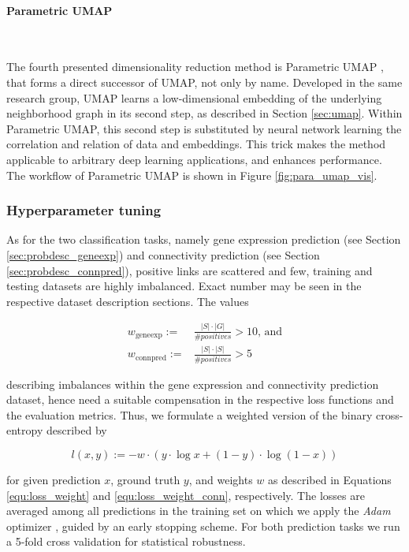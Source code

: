 \documentclass[]{article}
\renewcommand{\cite}{\citep}
\begin{document}
\paragraph{Parametric UMAP}\mbox{}\\
\label{sec:paraumap}

The fourth presented dimensionality reduction method is Parametric UMAP \cite{sainburg2021parametric}, that forms a direct successor of UMAP, not only by name. Developed in the same research group, UMAP learns a low-dimensional embedding of the underlying neighborhood graph in its second step, as described in Section \ref{sec:umap}. Within Parametric UMAP, this second step is substituted by neural network learning the correlation and relation of data and embeddings. This trick makes the method applicable to arbitrary deep learning applications, and enhances performance. The workflow of Parametric UMAP is shown in Figure \ref{fig:para_umap_vis}.

\subsubsection{Hyperparameter tuning}
\label{sec:hyperparameter_tuning}
As for the two classification tasks, namely gene expression prediction (see Section \ref{sec:probdesc_geneexp}) and connectivity prediction (see Section \ref{sec:probdesc_connpred}), positive links are scattered and few, training and testing datasets are highly imbalanced. Exact number may be seen in the respective dataset description sections.
The values

\begin{align}
	\label{equ:loss_weight}
	w_\text{geneexp}:=&\frac{|S| \cdot |G|}{\#positives} > 10 \text{, and}\\
	\label{equ:loss_weight_conn}
	w_\text{connpred}:=&\frac{|S| \cdot |S|}{\#positives} > 5
\end{align}

describing imbalances within the gene expression and connectivity prediction dataset, hence need a suitable compensation in the respective loss functions and the evaluation metrics. Thus, we formulate a weighted version of the binary cross-entropy described by

\begin{equation}
	l(x,y):= -w\cdot\left( y\cdot \log x + (1-y)\cdot\log(1-x) \right)
\end{equation}

for given prediction $x$, ground truth $y$, and weights $w$ as described in Equations \ref{equ:loss_weight} and \ref{equ:loss_weight_conn}, respectively. The losses are averaged among all predictions in the training set on which we apply the \textit{Adam} optimizer \cite{Adam2014}, guided by an early stopping scheme. For both prediction tasks we run a 5-fold cross validation for statistical robustness.\\
\end{document}
